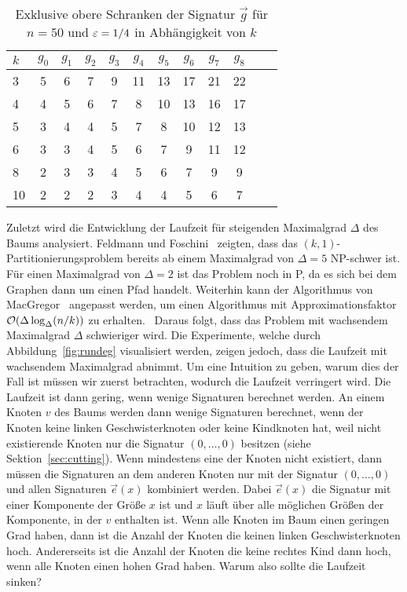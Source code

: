 \begin{table}
    \centering
    \begin{tabular}{l|*{11}{c}}
        $k$ & $g_0$ & $g_1$ & $g_2$ & $g_3$ & $g_4$ & $g_5$ & $g_6$ & $g_7$ & $g_8$ \\ \hline
        3 & 5 & 6 & 7 & 9 & 11 & 13 & 17 & 21 & 22 \\
        4 & 4 & 5 & 6 & 7 & 8 & 10 & 13 & 16 & 17 \\
        5 & 3 & 4 & 4 & 5 & 7 & 8 & 10 & 12 & 13 \\ 
        6 & 3 & 3 & 4 & 5 & 6 & 7 & 9 & 11 & 12 \\ 
        8 & 2 & 3 & 3 & 4 & 5 & 6 & 7 & 9 & 9 \\ 
        10 & 2 & 2 & 2 & 3 & 4 & 4 & 5 & 6 & 7 \\ 
    \end{tabular}
    \caption{Exklusive obere Schranken der Signatur $\vec{g}$ für $n=50$ und $\varepsilon=1/4$ in Abhängigkeit von $k$}\label{tab:ksig}
\end{table}

Zuletzt wird die Entwicklung der Laufzeit für steigenden Maximalgrad $\Delta$ des Baums analysiert.
Feldmann und Foschini~\cite{ff13} zeigten, dass das $(k, 1)$\hyp Partitionierungsproblem bereits ab einem Maximalgrad von $\Delta=5$ NP-schwer ist.
Für einen Maximalgrad von $\Delta=2$ ist das Problem noch in P, da es sich bei dem Graphen dann um einen Pfad handelt.
Weiterhin kann der Algorithmus von MacGregor~\cite{mcg78} angepasst werden, um einen Algorithmus mit Approximationsfaktor $\mathcal{O}(\Delta \log_\Delta(n/k))$ zu erhalten.~\cite{ff13}
Daraus folgt, dass das Problem mit wachsendem Maximalgrad $\Delta$ schwieriger wird.
Die Experimente, welche durch Abbildung~\ref{fig:rundeg} visualisiert werden, zeigen jedoch, dass die Laufzeit mit wachsendem Maximalgrad abnimmt.
Um eine Intuition zu geben, warum dies der Fall ist müssen wir zuerst betrachten, wodurch die Laufzeit verringert wird.
Die Laufzeit ist dann gering, wenn wenige Signaturen berechnet werden.
An einem Knoten $v$ des Baums werden dann wenige Signaturen berechnet, wenn der Knoten keine linken Geschwisterknoten oder keine Kindknoten hat, weil nicht existierende Knoten nur die Signatur $(0, \ldots, 0)$ besitzen (siehe Sektion~\ref{sec:cutting}).
Wenn mindestens eine der Knoten nicht existiert, dann müssen die Signaturen an dem anderen Knoten nur mit der Signatur $(0, \ldots, 0)$ und allen Signaturen $\vec{e}(x)$ kombiniert werden.
Dabei $\vec{e}(x)$ die Signatur mit einer Komponente der Größe $x$ ist und $x$ läuft über alle möglichen Größen der Komponente, in der $v$ enthalten ist.
Wenn alle Knoten im Baum einen geringen Grad haben, dann ist die Anzahl der Knoten die keinen linken Geschwisterknoten hoch. 
Andererseits ist die Anzahl der Knoten die keine rechtes Kind dann hoch, wenn alle Knoten einen hohen Grad haben.
Warum also sollte die Laufzeit sinken?

